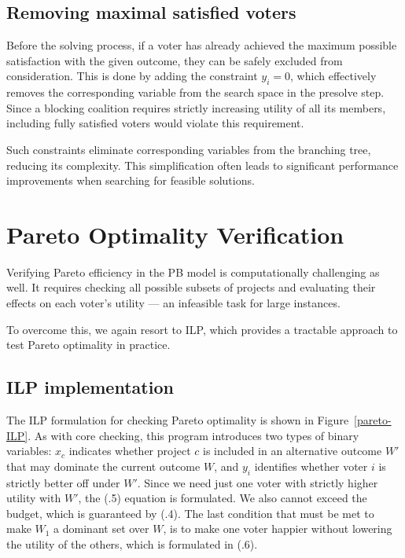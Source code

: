 \documentclass[magisterska,en]{pracamgr}
\begin{document}
\subsection{Removing maximal satisfied voters}

Before the solving process, if a voter has already achieved the maximum possible satisfaction with the given outcome, they can be safely excluded from consideration. This is done by adding the constraint $y_i=0$, which effectively removes the corresponding variable from the search space in the presolve step. Since a blocking coalition requires strictly increasing utility of all its members, including fully satisfied voters would violate this requirement.

Such constraints eliminate corresponding variables from the branching tree, reducing its complexity. This simplification often leads to significant performance improvements when searching for feasible solutions.

\section{Pareto Optimality Verification}

Verifying Pareto efficiency in the PB model is computationally challenging as well. It requires checking all possible subsets of projects and evaluating their effects on each voter's utility --- an infeasible task for large instances.

To overcome this, we again resort to ILP, which provides a tractable approach to test Pareto optimality in practice.

\subsection{ILP implementation}

The ILP formulation for checking Pareto optimality is shown in Figure~\ref{pareto-ILP}. As with core checking, this program introduces two types of binary variables: $x_c$ indicates whether project $c$ is included in an alternative outcome $W'$ that may dominate the current outcome $W$, and $y_i$ identifies whether voter $i$ is strictly better off under $W'$. Since we need just one voter with strictly higher utility with $W'$, the (\thechapter.5) equation is formulated. We also cannot exceed the budget, which is guaranteed by (\thechapter.4). The last condition that must be met to make $W_1$ a dominant set over $W$, is to make one voter happier without lowering the utility of the others, which is formulated in (\thechapter.6).
\end{document}
